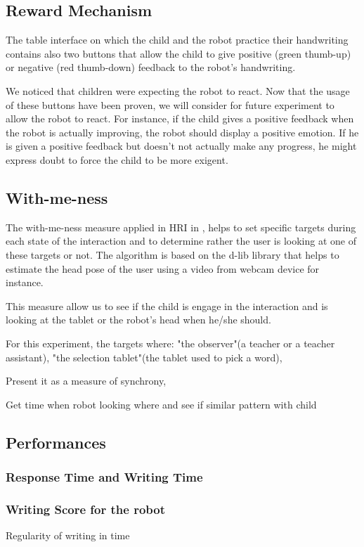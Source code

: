 \documentclass[letterpaper, 10 pt, conference]{ieeeconf}  %
\begin{document}
\subsection{Reward Mechanism}
The table interface on which the child and the robot practice their handwriting contains also two buttons that allow the child to give positive (green thumb-up) or negative (red thumb-down) feedback to the robot's handwriting.

We noticed that children were expecting the robot to react. 
Now that the usage of these buttons have been proven, we will consider for future experiment to allow the robot to react. 
For instance, if the child gives a positive feedback when the robot is actually improving, the robot should display a positive emotion.
If he is given a positive feedback but doesn’t not actually make any progress, he might express doubt to force the child to be more exigent. 


\subsection{With-me-ness}
The with-me-ness measure applied in HRI in \cite{lemaignan2016realtime}, helps to set specific targets during each state of the interaction and to determine rather the user is looking at one of these targets or not. 
The algorithm is based on the d-lib library that helps to estimate the head pose of the user using a video from webcam device for instance.

This measure allow us to see if the child is engage in the interaction and is looking at the tablet or the robot's head when he/she should.

For this experiment, the targets where: "the observer"(a teacher or a teacher assistant), "the selection tablet"(the tablet used to pick a word), 

Present it as a measure of synchrony, 

Get time when robot looking where and see if similar pattern with child

\subsection{Performances}
\subsubsection{Response Time and Writing Time}

\subsubsection{Writing Score for the robot}
Regularity of writing in time
\end{document}
